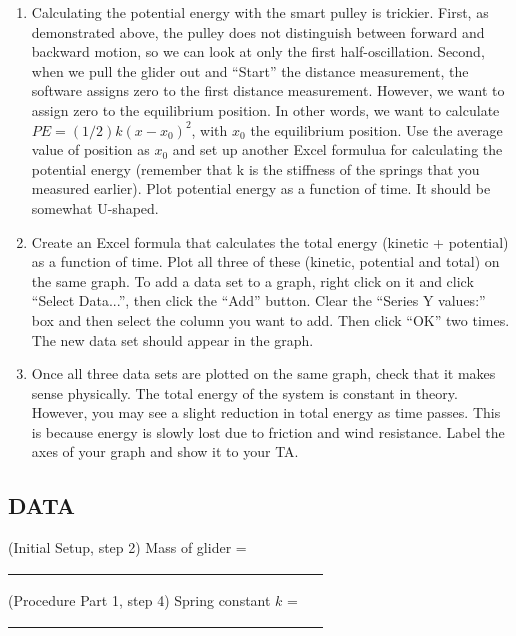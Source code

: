 \begin{enumerate}[label=\arabic*.]
\item Calculating the potential energy with the smart pulley is trickier.  First, as demonstrated above, the pulley does not distinguish between forward and backward motion, so we can look at only the first half-oscillation.  Second, when we pull the glider out and ``Start'' the distance measurement, the software assigns zero to the first distance measurement.  However, we want to assign zero to the equilibrium position.  In other words, we want to calculate \(PE = (1/2)k(x-x_0)^2\), with \(x_0\) the equilibrium position.  Use the average value of position as \(x_0\) and set up another Excel formulua for calculating the potential energy (remember that k is the stiffness of the springs that you measured earlier).  Plot potential energy as a function of time.  It should be somewhat U-shaped.  

\item Create an Excel formula that calculates the total energy (kinetic + potential) as a function of time.  Plot all three of these (kinetic, potential and total) on the same graph.  To add a data set to a graph, right click on it and click ``Select Data...'', then click the ``Add'' button.  Clear the ``Series Y values:'' box and then select the column you want to add.  Then click ``OK'' two times.  The new data set should appear in the graph.

\item Once all three data sets are plotted on the same graph, check that it makes sense physically.  The total energy of the system is constant in theory.  However, you may see a slight reduction in total energy as time passes.  This is because energy is slowly lost due to friction and wind resistance.  Label the axes of your graph and show it to your TA.

\end{enumerate}

\subsection*{DATA}

\vphantom{.}
\squishlist

\item (Initial Setup, step 2) Mass of glider = \ul{~~~~~~~~~~~~~~~~~~~~~~~~~~~~~~~~~~~~~~~~~~~~~}

\item (Procedure Part 1, step 4) Spring constant \(k\) = \ul{~~~~~~~~~~~~~~~~~~~~~~~~~~~~~~~~~~~~~~~~~~~~~}

